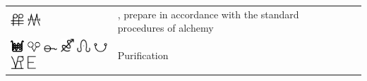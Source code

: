 \documentclass[british,final,landscape]{scrartcl}
\begin{document}
\begin{refsection}
\begin{supertabular}{p{0.3\textwidth}p{0.34\textwidth}p{0.34\textwidth}}
   \includegraphics[width=5mm]{Process/Prepare} \includegraphics[width=5mm]{Process/Prepare2} & , prepare in accordance with the standard procedures of alchemy & \\
   \includegraphics[width=5mm]{Process/Purification} \includegraphics[width=5mm]{Process/Purification2} \includegraphics[width=5mm]{Process/Purification3} \includegraphics[width=5mm]{Process/Purification4} \includegraphics[width=5mm]{Process/Purification5} \includegraphics[width=5mm]{Process/Purification6} \includegraphics[width=5mm]{Process/Purification7} \includegraphics[height=5mm]{Process/Purification8} & Purification & \\

\end{supertabular}
\end{refsection}
\end{document}
